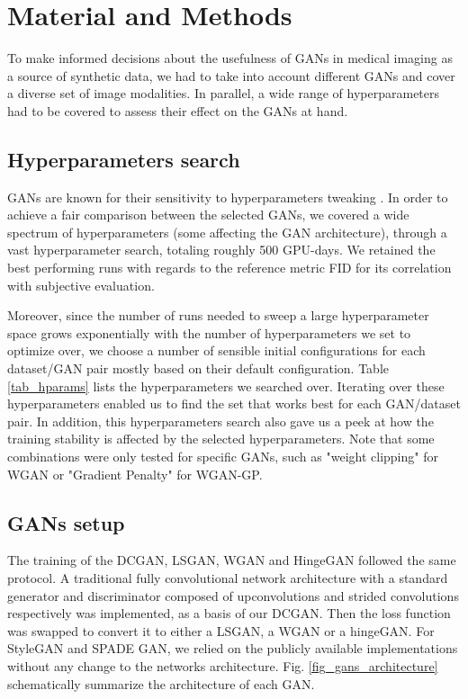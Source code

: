 \documentclass[preprint,12pt, authoryear]{elsarticle}
\begin{document}
\section{Material and Methods}
\label{sec:protocol}
To make informed decisions about the usefulness of GANs in medical imaging as a source of synthetic data, we had to take into account different GANs and cover a diverse set of image modalities. In parallel, a wide range of hyperparameters had to be covered to assess their effect on the GANs at hand.


\subsection{Hyperparameters search}


GANs are known for their sensitivity to hyperparameters tweaking \citep{Lucic2018AreGC}. In order to achieve a fair comparison between the selected GANs, we covered a wide spectrum of hyperparameters (some affecting the GAN architecture), through a vast hyperparameter search, totaling roughly 500 GPU-days. We retained the best performing runs with regards to the reference metric FID for its correlation with subjective evaluation.

Moreover, since the number of runs needed to sweep a large hyperparameter space grows exponentially with the number of hyperparameters we set to optimize over, we choose a number of sensible initial configurations for each dataset/GAN pair mostly based on their default configuration. 
Table \ref{tab_hparams} lists the hyperparameters we searched over. Iterating over these hyperparameters enabled us to find the set that works best for each GAN/dataset pair. In addition, this hyperparameters search also gave us a peek at how the training stability is affected by the selected hyperparameters. Note that some combinations were only tested for specific GANs, such as "weight clipping" for WGAN or "Gradient Penalty" for WGAN-GP.

\subsection{GANs setup}
The training of the DCGAN, LSGAN, WGAN and HingeGAN followed the same protocol. A traditional fully convolutional network architecture with a standard generator and discriminator composed of upconvolutions and strided convolutions respectively was implemented, as a basis of our DCGAN. Then the loss function was swapped to convert it to either a LSGAN, a WGAN or a hingeGAN. For StyleGAN and SPADE GAN, we relied on the publicly available implementations without any change to the networks architecture.
Fig. \ref{fig_gans_architecture} schematically summarize  the architecture of each GAN.
\end{document}

